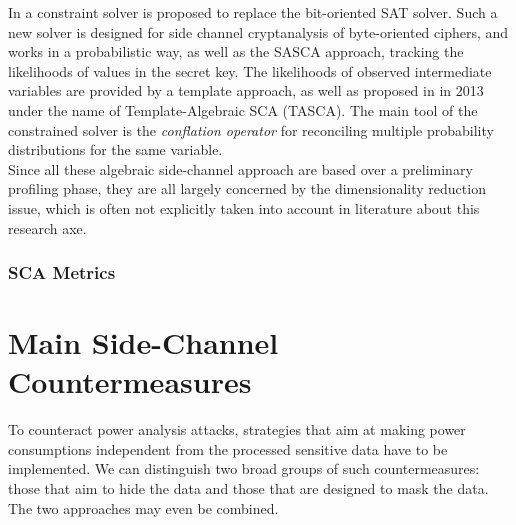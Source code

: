 In \cite{Oren2014} a constraint solver is proposed to replace the bit-oriented SAT solver. Such a new solver is designed for side channel cryptanalysis of byte-oriented ciphers, and works in a probabilistic way, as well as the SASCA approach, tracking the likelihoods of values in the secret key. The likelihoods of observed intermediate variables are provided by a template approach, as well as proposed in \cite{Oren:2013} in 2013 under the name of Template-Algebraic SCA (TASCA). The main tool  of the constrained solver is the \emph{conflation operator} for reconciling multiple probability distributions for the same variable.\\

Since all these algebraic side-channel approach are based over a preliminary profiling phase, they are all largely concerned by the dimensionality reduction issue, which is often not explicitly taken into account in literature about this research axe. 

\subsubsection{SCA Metrics}


\section{Main Side-Channel Countermeasures}\label{sec:countermeasures}
To counteract power analysis attacks, strategies that aim at making power consumptions independent from the processed sensitive data have to be implemented. We can distinguish two broad groups of such countermeasures: 
those that aim to hide the data and those that are designed to mask the data. The two approaches may even be combined.

